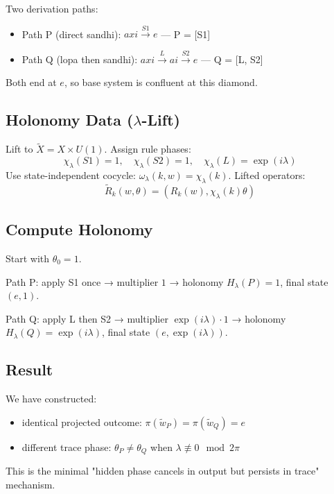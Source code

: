 \documentclass[12pt, oneside]{article}
\begin{document}
Two derivation paths:
\begin{itemize}
    \item Path P (direct sandhi): $axi \xrightarrow{S1} e$ — P = [S1]
    \item Path Q (lopa then sandhi): $axi \xrightarrow{L} ai \xrightarrow{S2} e$ — Q = [L, S2]
\end{itemize}
Both end at $e$, so base system is confluent at this diamond.

\subsection{Holonomy Data ($\lambda$-Lift)}

Lift to $\widetilde{X} = X \times U(1)$. Assign rule phases:
\begin{equation}
\chi_\lambda(S1) = 1, \quad \chi_\lambda(S2) = 1, \quad \chi_\lambda(L) = \exp(i\lambda)
\end{equation}
Use state-independent cocycle: $\omega_\lambda(k,w) = \chi_\lambda(k)$. Lifted operators:
\begin{equation}
\widetilde{R}_k(w,\theta) = (R_k(w), \chi_\lambda(k)\theta)
\end{equation}

\subsection{Compute Holonomy}

Start with $\theta_0 = 1$.

Path P: apply S1 once → multiplier $1$ → holonomy $H_\lambda(P) = 1$, final state $(e,1)$.

Path Q: apply L then S2 → multiplier $\exp(i\lambda) \cdot 1$ → holonomy $H_\lambda(Q) = \exp(i\lambda)$, final state $(e,\exp(i\lambda))$.

\subsection{Result}

We have constructed:
\begin{itemize}
    \item identical projected outcome: $\pi(\widetilde{w}_P) = \pi(\widetilde{w}_Q) = e$
    \item different trace phase: $\theta_P \neq \theta_Q$ when $\lambda \not\equiv 0 \mod 2\pi$
\end{itemize}
This is the minimal "hidden phase cancels in output but persists in trace" mechanism.
\end{document}
